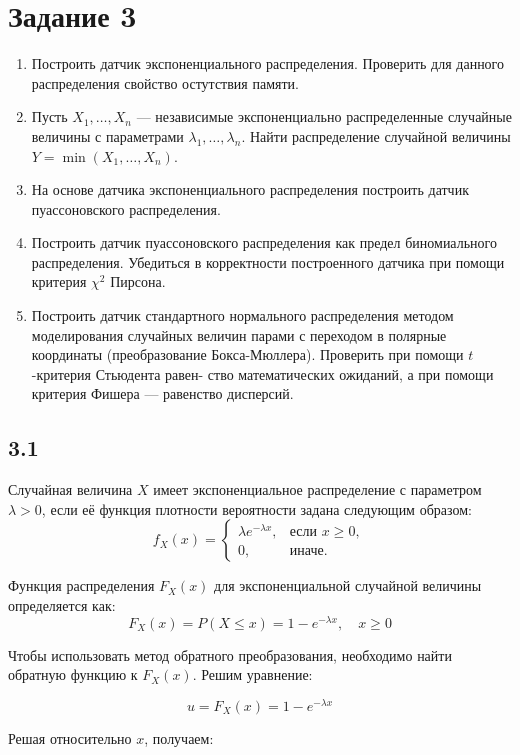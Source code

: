\documentclass[11pt]{article}
\begin{document}
\section{Задание 3}
\begin{enumerate}
 \item Построить датчик экспоненциального распределения. Проверить для данного распределения свойство остутствия памяти.
 \item Пусть $X_1,\ldots,X_n$ — независимые экспоненциально распределенные случайные
величины с параметрами $\lambda_1 ,\ldots,\lambda_n$. Найти распределение случайной величины
$Y = \min(X_1 ,\ldots,X_n)$.
  \item На основе датчика экспоненциального распределения построить датчик пуассоновского распределения.
  \item Построить датчик пуассоновского распределения как предел биномиального распределения. Убедиться в корректности построенного датчика при помощи критерия $\chi^2$ Пирсона.
  \item Построить датчик стандартного нормального распределения методом моделирования случайных величин парами с переходом в полярные координаты (преобразование Бокса-Мюллера). Проверить при помощи $t$-критерия Стьюдента равен-
ство математических ожиданий, а при помощи критерия Фишера — равенство дисперсий.

\end{enumerate}

\subsection{3.1}
Случайная величина $X$ имеет экспоненциальное распределение с параметром $\lambda > 0$, если её функция плотности вероятности задана следующим образом:
$$
f_X(x) = 
\begin{cases} 
\lambda e^{-\lambda x}, & \text{если } x \geq 0, \\ 
0, & \text{иначе.} 
\end{cases}
$$


Функция распределения $F_X(x)$ для экспоненциальной случайной величины определяется как:
$$
F_X(x) = P(X \leq x) = 1 - e^{-\lambda x}, \quad x \geq 0
$$


Чтобы использовать метод обратного преобразования, необходимо найти обратную функцию к $F_X(x)$. Решим уравнение:

$$
u = F_X(x) = 1 - e^{-\lambda x}
$$

Решая относительно $x$, получаем:
\end{document}
